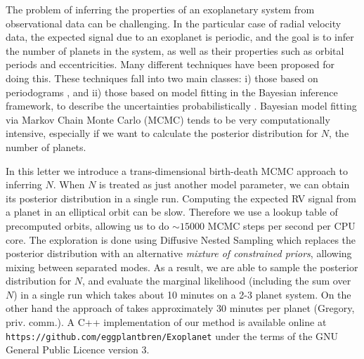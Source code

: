\documentclass[useAMS,usenatbib]{mn2e}
\begin{document}
The problem of inferring the properties of an
exoplanetary system from observational data can be challenging.
In the particular case of radial velocity data,
the expected signal due to an exoplanet is periodic, and the goal is to
infer the number of planets in the system, as well as their properties such
as orbital periods and eccentricities. Many
different techniques have been proposed for doing this.
These techniques fall into two main
classes: i) those based on periodograms \citep[e.g.][]{2009A&A...496..577Z},
and ii) those based on model fitting in the Bayesian inference framework,
to describe the uncertainties probabilistically
\citep[e.g.][]{2011MNRAS.410...94G, 2014MNRAS.437.3540F,
2011A&A...528L...5T, fengji}. Bayesian model fitting via Markov Chain Monte
Carlo (MCMC) tends to be very computationally intensive, especially if we
want to calculate the posterior distribution for $N$, the number of planets.

In this letter we introduce a trans-dimensional birth-death MCMC approach
\citep{birthdeath} to inferring $N$.
When $N$ is treated as just another model parameter, we can obtain its
posterior distribution in a single run. Computing the expected RV signal from
a planet in an elliptical orbit can be slow. Therefore we use a lookup table
of precomputed orbits, allowing us to do $\sim 15000$ MCMC steps per second
per CPU core. The exploration is done using Diffusive Nested Sampling
\citep{dnest} which replaces the posterior distribution with an alternative
{\it mixture of constrained priors}, allowing mixing between separated modes.
As a result, we are able to sample the posterior distribution for $N$, and
evaluate the marginal likelihood (including the sum over $N$) in
a single run which takes about 10 minutes on a 2-3 planet system.
On the other hand the approach of
\citet{2011MNRAS.410...94G} takes approximately 30 minutes per planet
(Gregory, priv. comm.). A C++ implementation of our method is available online
at {\tt https://github.com/eggplantbren/Exoplanet} under the terms of the
GNU General Public Licence version 3.
\end{document}

